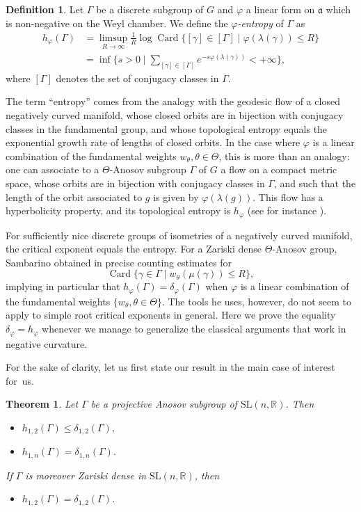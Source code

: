 \documentclass[JEP,XML,SOM,Unicode,NoEqCountersInSection,NoFloatCountersInSection,published]{cedram}
\newtheorem{theorem}[theo]{Theorem}
\theoremstyle{definition}
\newtheorem{defi}[theo]{Definition}
\newcommand{\R}{\mathbb{R}}
\newcommand{\SL}{\mathrm{SL}}
\newcommand{\fa}{\mathfrak{a}}
\DeclareMathOperator{\Card}{Card}
\let\phi\varphi
\let\G\Gamma
\let\g\gamma
\begin{document}
\begin{defi} \label{def - entropy}
Let $\G$ be a discrete subgroup of $G$ and $\varphi$ a linear form on $\fa$ which is non-negative on the Weyl chamber. We define the \emph{$\varphi$-entropy} of $\G$ as
\begin{align*}
h_\varphi(\G) &= \limsup_{R\to \infty} \frac{1}{R} \log \Card \{ [\g] \in [\G] \mid \varphi(\lambda(\g)) \leq R\} \\
&\textstyle= \inf\bigl\{s>0\mid \sum_{[\g]\in [\G]} e^{-s\varphi(\lambda(\g))} < +\infty\bigr\},
\end{align*}
where $[\G]$ denotes the set of conjugacy classes in $\G$.
\end{defi}

The term ``entropy'' comes from the analogy with the geodesic flow of a closed negatively curved manifold, whose closed orbits are in bijection with conjugacy classes in the fundamental group, and whose topological entropy equals the exponential growth rate of lengths of closed orbits. In the case where $\phi$ is a linear combination of the fundamental weights $w_\theta, \theta \in \Theta$, this is more than an analogy: one can associate to a $\Theta$-Anosov subgroup $\Gamma$ of $G$ a flow on a compact metric space, whose orbits are in bijection with conjugacy classes in $\Gamma$, and such that the length of the orbit associated to $g$ is given by $\phi(\lambda(g))$. This flow has a hyperbolicity property, and its topological entropy is $h_\phi$ (see for instance \cite{sambarino2014quantitative}).

For sufficiently nice discrete groups of isometries of a negatively curved manifold, the critical exponent equals the entropy. For a Zariski dense $\Theta$-Anosov group, Sambarino obtained in \cite{sambarino2014quantitative} precise counting estimates for
\[\Card \{\gamma \in \Gamma \mid w_\theta(\mu(\gamma))\leq R\},\]
implying in particular that $h_\phi(\Gamma) = \delta_\phi(\Gamma)$ when $\phi$ is a linear combination of the fundamental weights $\{w_\theta,\theta \in \Theta\}$. The tools he uses, however, do not seem to apply to simple root critical exponents in general. Here we prove the equality $\delta_\phi = h_\phi$ whenever we manage to generalize the classical arguments that work in negative curvature.

For the sake of clarity, let us first state our result in the main case of interest for~us.

\begin{theorem}\label{theo-specialcaseSL(n,R)}
Let $\Gamma$ be a projective Anosov subgroup of $\SL(n,\R)$. Then
\begin{itemize}
\item $h_{1,2}(\Gamma)\leq \delta_{1,2}(\Gamma),$
\item $h_{1,n}(\Gamma)= \delta_{1,n}(\Gamma).$
\end{itemize}
If $\G$ is moreover Zariski dense in $\SL(n,\R)$, then
\begin{itemize}
\item $h_{1,2}(\Gamma) = \delta_{1,2}(\Gamma)$.
\end{itemize}
\end{theorem}
\end{document}
